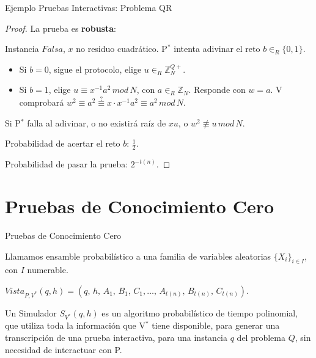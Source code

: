 \documentclass{beamer}
\begin{document}
\begin{frame}{Ejemplo Pruebas Interactivas: Problema QR}
\begin{proof}
	La prueba es \textbf{robusta}:
	
	Instancia $Falsa$, $x$ no residuo cuadrático.
	P$^*$ intenta adivinar el reto $b\in_R\{0,1\}$.
	\begin{itemize}
		\item Si $b=0$, sigue el protocolo, elige $u \in_R \mathbb{Z}^{Q+}_N$.
		
		\item Si $b=1$, elige $u \equiv x^{-1} a^2 \, mod \, N$, con $a \in_R \mathbb{Z}_N$.
		Responde con $w = a$.		
		V comprobará $w^2\equiv a^2 \overset{?}{\equiv} x\cdot x^{-1} a^2 \equiv a^2 \, mod \, N$.
	\end{itemize}

	Si P$^*$ falla al adivinar, o no existirá raíz de $xu$, o $w^2 \not \equiv u \, mod \, N$.
	
	Probabilidad de acertar el reto $b$: $\frac{1}{2}$.
	
	Probabilidad de pasar la prueba: $2^{-t(n)}$.
	
\end{proof}
\end{frame}



\section{Pruebas de Conocimiento Cero}


\begin{frame}{Pruebas de Conocimiento Cero} 
	\begin{definition}[Ensamble] 
		Llamamos ensamble probabilístico a una familia de variables aleatorias $\{X_i\}_{i\in I}$, con $I$ numerable. 
	\end{definition} 
	$ Vista_{P,V^*}(q,h) = (q,\,h,\,A_1,\,B_1,\,C_1, \dots ,\,A_{t(n)},\,B_{t(n)},\,C_{t(n)}). $ 
	
	\begin{definition}[Simulador] 
		Un Simulador $S_{V^*}(q,h)$ es un algoritmo probabilístico de tiempo polinomial, que utiliza toda la información que V$^*$ tiene disponible, para generar una transcripción de una prueba interactiva, para una instancia $q$ del problema $Q$, sin necesidad de interactuar con P. 
	\end{definition}
\end{frame} 
\end{document}
